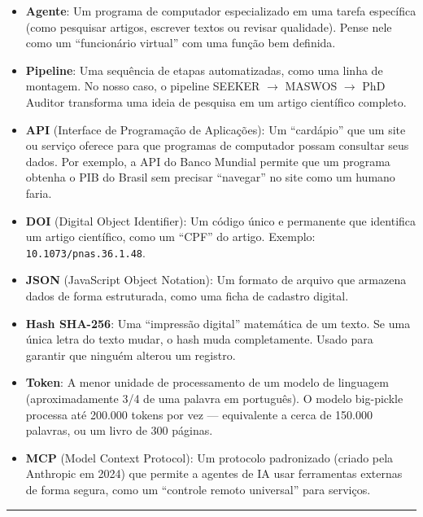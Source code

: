 \documentclass[12pt,a4paper]{article}
\begin{document}
\begin{itemize}[itemsep=1pt]
  \item \textbf{Agente}: Um programa de computador especializado em uma tarefa específica (como pesquisar artigos, escrever textos ou revisar qualidade). Pense nele como um ``funcionário virtual'' com uma função bem definida.
  \item \textbf{Pipeline}: Uma sequência de etapas automatizadas, como uma linha de montagem. No nosso caso, o pipeline SEEKER $\rightarrow$ MASWOS $\rightarrow$ PhD Auditor transforma uma ideia de pesquisa em um artigo científico completo.
  \item \textbf{API} (Interface de Programação de Aplicações): Um ``cardápio'' que um site ou serviço oferece para que programas de computador possam consultar seus dados. Por exemplo, a API do Banco Mundial permite que um programa obtenha o PIB do Brasil sem precisar ``navegar'' no site como um humano faria.
  \item \textbf{DOI} (Digital Object Identifier): Um código único e permanente que identifica um artigo científico, como um ``CPF'' do artigo. Exemplo: \texttt{10.1073/pnas.36.1.48}.
  \item \textbf{JSON} (JavaScript Object Notation): Um formato de arquivo que armazena dados de forma estruturada, como uma ficha de cadastro digital.
  \item \textbf{Hash SHA-256}: Uma ``impressão digital'' matemática de um texto. Se uma única letra do texto mudar, o hash muda completamente. Usado para garantir que ninguém alterou um registro.
  \item \textbf{Token}: A menor unidade de processamento de um modelo de linguagem (aproximadamente 3/4 de uma palavra em português). O modelo big-pickle processa até 200.000 tokens por vez --- equivalente a cerca de 150.000 palavras, ou um livro de 300 páginas.
  \item \textbf{MCP} (Model Context Protocol): Um protocolo padronizado (criado pela Anthropic em 2024) que permite a agentes de IA usar ferramentas externas de forma segura, como um ``controle remoto universal'' para serviços.
\end{itemize}

\vspace{12pt}
\hrule
\vspace{12pt}
\end{document}
